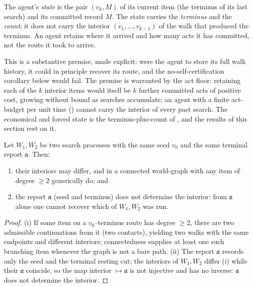 \documentclass[11pt,twocolumn,a4paper]{article}
\newcommand{\Walk}{W}
\newcommand{\rec}{M}
\newcommand{\acct}{\mathfrak{a}}   %
\begin{document}
\begin{definition}
\label{def:agentstate}
The agent's \emph{state} is the pair $(v_k,\rec)$ of its current item (the
terminus of its last search) and its committed record $\rec$. The state
carries the \emph{terminus} and the \emph{count}; it does not carry the
interior $(v_1,\dots,v_{k-1})$ of the walk that produced the terminus. An
agent retains where it arrived and how many acts it has committed, not the
route it took to arrive.
\end{definition}

\begin{remark}
\label{rem:state-excludes}
This is a substantive premise, made explicit: were the agent to store its
full walk history, it could in principle recover its route, and the
no-self-certification corollary below would fail. The premise is warranted
by the act floor: retaining each of the $k$ interior items would itself be
$k$ further committed acts of positive cost, growing without bound as
searches accumulate; an agent with a finite act-budget per unit time
() cannot carry the interior of every past search. The
economical and forced state is the terminus-plus-count of
, and the results of this section rest on it.
\end{remark}

\begin{theorem}
\label{thm:opacity}
Let $\Walk_1,\Walk_2$ be two search processes with the same seed $v_0$ and
the same terminal report $\acct$. Then:
\begin{enumerate}[label=\textup{(\roman*)},leftmargin=2.2em]
\item their interiors may differ, and in a connected world-graph with any
item of degree $\ge2$ generically do; and
\item the report $\acct$ (seed and terminus) does not determine the
interior: from $\acct$ alone one cannot recover which of $\Walk_1,\Walk_2$
was run.
\end{enumerate}
\end{theorem}

\begin{proof}
(i) If some item on a $v_0$--terminus route has degree $\ge2$, there are two
admissible continuations from it (two contacts), yielding two walks with the
same endpoints and different interiors; connectedness supplies at least one
such branching item whenever the graph is not a bare path. (ii) The report
$\acct$ records only the seed and the terminal resting cut; the interiors of
$\Walk_1,\Walk_2$ differ (i) while their $\acct$ coincide, so the map
interior $\mapsto\acct$ is not injective and has no inverse: $\acct$ does
not determine the interior.
\end{proof}
\end{document}
